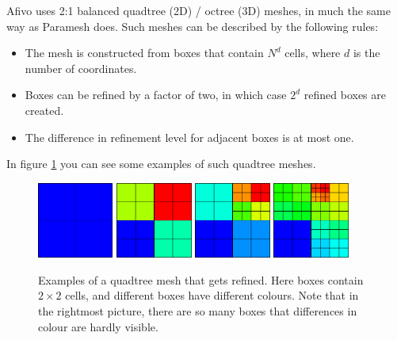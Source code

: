 \documentclass[a4paper, a4wide]{article}
\begin{document}
Afivo uses 2:1 balanced quadtree (2D) / octree (3D) meshes, in much the same way
as Paramesh does.
Such meshes can be described by the following rules:

\begin{itemize}
  \item The mesh is constructed from boxes that contain $N^d$ cells, where $d$
  is the number of coordinates.
  \item Boxes can be refined by a factor of two, in which case $2^d$ refined
  boxes are created.
  \item The difference in refinement level for adjacent boxes is at most one.
\end{itemize}

In figure \ref{fig:example-quadtree} you can see some examples of such quadtree
meshes.

\begin{figure}
  \centering
  \includegraphics[width=2.5cm]{figures/quadtree_cex1.png}
  \includegraphics[width=2.5cm]{figures/quadtree_cex2.png}
  \includegraphics[width=2.5cm]{figures/quadtree_cex3.png}
  \includegraphics[width=2.5cm]{figures/quadtree_cex4.png}
  \caption{Examples of a quadtree mesh that gets refined.
    Here boxes contain $2 \times 2$ cells, and different boxes have different
    colours. Note that in the rightmost picture, there are so many boxes that
    differences in colour are hardly visible.}
  \label{fig:example-quadtree}
\end{figure}
\end{document}
